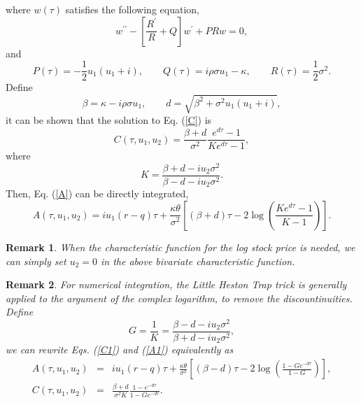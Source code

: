 \documentclass[12pt]{article}
\newtheorem{remark}{Remark}
\begin{document}
    where $w(\tau)$ satisfies the following equation,
    \begin{equation}
      w^{\prime\prime}-\left[\frac{R^{\prime}}{R}+Q\right]w^{\prime}+PRw=0,
    \end{equation}
    and
    \begin{equation}
      P(\tau) = -\frac{1}{2}u_1(u_1+i), \quad\quad Q(\tau)=i\rho\sigma u_1-\kappa,
      \quad\quad R(\tau)=\frac{1}{2}\sigma^2.
    \end{equation}
    Define
    \begin{equation}
      \beta = \kappa-i\rho\sigma u_1, \quad\quad  d=\sqrt{\beta^2+\sigma^2u_1(u_1+i)},
    \end{equation}
    it can be shown that the solution to Eq. (\ref{C}) is
    \begin{equation}
      C(\tau,u_1,u_2)=\frac{\beta+d}{\sigma^2}\frac{e^{d\tau}-1}{Ke^{d\tau}-1},
      \label{C1}
    \end{equation}
    where
    \begin{equation}
      K=\frac{\beta+d-iu_2\sigma^2}{\beta-d-iu_2\sigma^2}.
    \end{equation}
    Then, Eq. (\ref{A}) can be directly integrated,
    \begin{equation}
      A(\tau,u_1,u_2)=iu_1(r-q)\tau+\frac{\kappa\theta}{\sigma^2}\left[(\beta+d)\tau
                      -2\log\left(\frac{Ke^{d\tau}-1}{K-1}\right)\right].
      \label{A1}
    \end{equation}

    \begin{remark}
      When the characteristic function for the log stock price is needed, we can simply set $u_2=0$ in the
      above bivariate characteristic function.
    \end{remark}

    \begin{remark}
      For numerical integration, the {\it Little Heston Trap} trick is generally applied to the argument of the
      complex logarithm, to remove the discountinuities. Define
      \begin{equation}
        G=\frac{1}{K}=\frac{\beta-d-iu_2\sigma^2}{\beta+d-iu_2\sigma^2},
      \end{equation}
      we can rewrite Eqs. (\ref{C1}) and (\ref{A1}) equivalently as
      \begin{eqnarray}
        A(\tau,u_1,u_2) &=& iu_1(r-q)\tau+\frac{\kappa\theta}{\sigma^2}\left[(\beta-d)\tau
                      -2\log\left(\frac{1-Ge^{-d\tau}}{1-G}\right)\right], \\
        C(\tau,u_1,u_2) &=& \frac{\beta+d}{\sigma^2K}\frac{1-e^{-d\tau}}{1-Ge^{-d\tau}}.
      \end{eqnarray}
    \end{remark}
\end{document}
